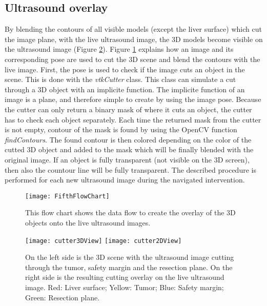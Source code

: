 \subsection{Ultrasound overlay}
By blending the contours of all visible models (except the liver surface) which cut the image plane,
with the live ultrasound image, the 3D models become visible on the ultrasound
image (Figure \ref{fig:cutterExample}). Figure \ref{fig:FifthFlowChart} explains how an image and its
corresponding pose are used to cut the 3D scene and blend the contours with the
live image. First, the pose is used to check if the image cuts an object in the
scene. This is done with the \textit{vtkCutter} class. This class can simulate a
cut through a 3D object with an implicite function. The implicite function of an
image is a plane, and therefore simple to create by using the image pose. Because the
cutter can only return a binary mask of where it cuts an object, the cutter
has to check each object separately. Each time the returned mask from the cutter
is not empty, contour of the mask is found by using the OpenCV function
\textit{findContours}. The found contour is then colored depending on the color
of the cutted 3D object and added to the mask which will be finally blended with
the original image. If an object is fully transparent (not visible on the 3D
screen), then also the countour line will be fully transparent. The described procedure is performed for each new ultrasound image
during the navigated intervention. 
\begin{figure}[H]
  \centering
 \texttt{[image: FifthFlowChart]}
  \caption{This flow chart shows the data flow to create the overlay of the 3D
    objects onto the live ultrasound images.}
  \label{fig:FifthFlowChart}
\end{figure}
\begin{figure}[H]
  \centering
  \texttt{[image: cutter3DView]} 
  \endminipage
  \hfill
  \texttt{[image: cutter2DView]}
  \endminipage
  \hfill 
 \caption{On the left side is the 3D scene with the ultrasound image cutting
   through the tumor, safety margin and the resection plane. On the right side
   is the resulting cutting overlay on the live ultrasound image. Red: Liver
 surface; Yellow: Tumor; Blue: Safety margin; Green: Resection plane.}
  \label{fig:cutterExample}
\end{figure}
